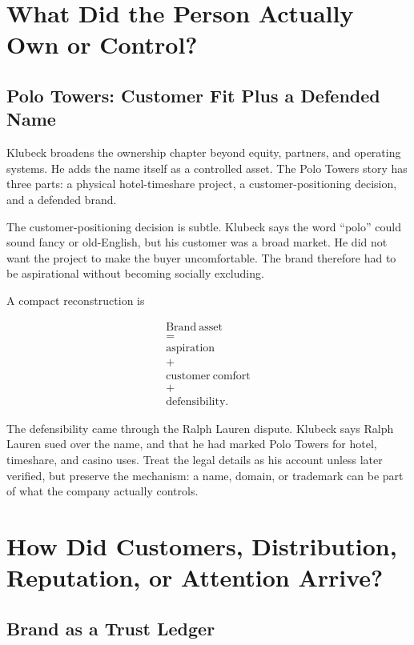 \documentclass[11pt,oneside]{book}
\begin{document}
\chapter{What Did the Person Actually Own or Control?}

\section{Polo Towers: Customer Fit Plus a Defended Name}

Klubeck broadens the ownership chapter beyond equity, partners, and operating systems. He adds the name itself as a controlled asset. The Polo Towers story has three parts: a physical hotel-timeshare project, a customer-positioning decision, and a defended brand.

The customer-positioning decision is subtle. Klubeck says the word ``polo'' could sound fancy or old-English, but his customer was a broad market. He did not want the project to make the buyer uncomfortable. The brand therefore had to be aspirational without becoming socially excluding.

A compact reconstruction is

\begin{equation}
\begin{gathered}
\mathrm{Brand\ asset}\\
=\\
\mathrm{aspiration}\\
+\\
\mathrm{customer\ comfort}\\
+\\
\mathrm{defensibility}.
\end{gathered}
\end{equation}

The defensibility came through the Ralph Lauren dispute. Klubeck says Ralph Lauren sued over the name, and that he had marked Polo Towers for hotel, timeshare, and casino uses. Treat the legal details as his account unless later verified, but preserve the mechanism: a name, domain, or trademark can be part of what the company actually controls.

\chapter{How Did Customers, Distribution, Reputation, or Attention Arrive?}

\section{Brand as a Trust Ledger}
\end{document}
